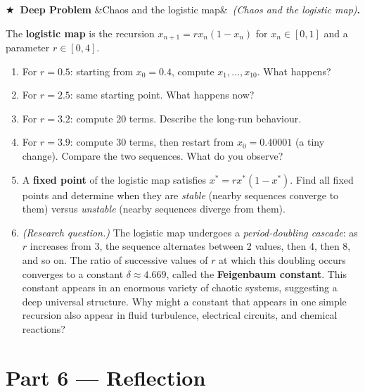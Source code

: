 \documentclass[12pt, a4paper]{article}
\newcounter{problem}
\newcounter{deepproblem}
\newenvironment{deepproblem}[1][]{%
  \refstepcounter{deepproblem}%
  \par\vspace{6pt}%
  \noindent\textbf{\color{NavyBlue}$\bigstar$\ Deep Problem \thedeepproblem}%
  \ifx&#1&\else\ \textit{(#1)}\fi\textbf{.}\enskip
}{\par\vspace{4pt}}
\begin{document}
\begin{deepproblem}[Chaos and the logistic map]
The \textbf{logistic map} is the recursion $x_{n+1} = rx_n(1 - x_n)$ for $x_n \in [0,1]$ and a parameter $r \in [0,4]$.
\begin{enumerate}[label=(\alph*)]
  \item For $r = 0.5$: starting from $x_0 = 0.4$, compute $x_1, \ldots, x_{10}$. What happens?
  \item For $r = 2.5$: same starting point. What happens now?
  \item For $r = 3.2$: compute 20 terms. Describe the long-run behaviour.
  \item For $r = 3.9$: compute 30 terms, then restart from $x_0 = 0.40001$ (a tiny change). Compare the two sequences. What do you observe?
  \item A \textbf{fixed point} of the logistic map satisfies $x^* = rx^*(1-x^*)$. Find all fixed points and determine when they are \emph{stable} (nearby sequences converge to them) versus \emph{unstable} (nearby sequences diverge from them).
  \item \textit{(Research question.)} The logistic map undergoes a \emph{period-doubling cascade}: as $r$ increases from 3, the sequence alternates between 2 values, then 4, then 8, and so on. The ratio of successive values of $r$ at which this doubling occurs converges to a constant $\delta \approx 4.669$, called the \textbf{Feigenbaum constant}. This constant appears in an enormous variety of chaotic systems, suggesting a deep universal structure. Why might a constant that appears in one simple recursion also appear in fluid turbulence, electrical circuits, and chemical reactions?
\end{enumerate}
\end{deepproblem}

\section{Part 6 \texorpdfstring{---}{--} Reflection}
\end{document}
